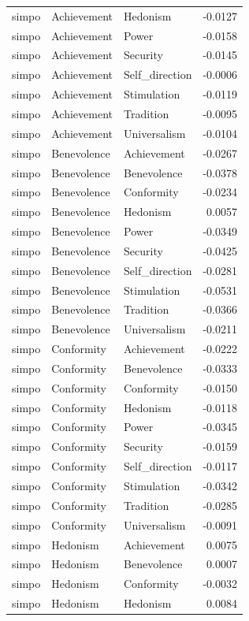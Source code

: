 \begin{tabular}{lllr}
simpo & Achievement & Hedonism & -0.0127 \\
simpo & Achievement & Power & -0.0158 \\
simpo & Achievement & Security & -0.0145 \\
simpo & Achievement & Self\_direction & -0.0006 \\
simpo & Achievement & Stimulation & -0.0119 \\
simpo & Achievement & Tradition & -0.0095 \\
simpo & Achievement & Universalism & -0.0104 \\
simpo & Benevolence & Achievement & -0.0267 \\
simpo & Benevolence & Benevolence & -0.0378 \\
simpo & Benevolence & Conformity & -0.0234 \\
simpo & Benevolence & Hedonism & 0.0057 \\
simpo & Benevolence & Power & -0.0349 \\
simpo & Benevolence & Security & -0.0425 \\
simpo & Benevolence & Self\_direction & -0.0281 \\
simpo & Benevolence & Stimulation & -0.0531 \\
simpo & Benevolence & Tradition & -0.0366 \\
simpo & Benevolence & Universalism & -0.0211 \\
simpo & Conformity & Achievement & -0.0222 \\
simpo & Conformity & Benevolence & -0.0333 \\
simpo & Conformity & Conformity & -0.0150 \\
simpo & Conformity & Hedonism & -0.0118 \\
simpo & Conformity & Power & -0.0345 \\
simpo & Conformity & Security & -0.0159 \\
simpo & Conformity & Self\_direction & -0.0117 \\
simpo & Conformity & Stimulation & -0.0342 \\
simpo & Conformity & Tradition & -0.0285 \\
simpo & Conformity & Universalism & -0.0091 \\
simpo & Hedonism & Achievement & 0.0075 \\
simpo & Hedonism & Benevolence & 0.0007 \\
simpo & Hedonism & Conformity & -0.0032 \\
simpo & Hedonism & Hedonism & 0.0084 \\

\end{tabular}
